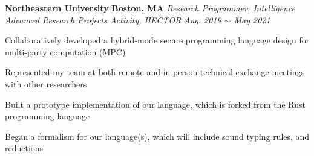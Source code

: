\item
\headerrow
{\textbf{Northeastern University}}
{\textbf{Boston, MA}}
\headerrow
{\emph{Research Programmer, Intelligence Advanced Research Projects Activity,
 HECTOR}}
{\emph{Aug. 2019 $\sim$ May 2021}}
\begin{itemize*}
    \item Collaboratively developed a hybrid-mode secure programming language
    design for multi-party computation (MPC)
    \item Represented my team at both remote and in-person technical exchange
    meetings with other researchers
    \item Built a prototype implementation of our language, which is forked
    from the Rust programming language
    \item Began a formalism for our language(s), which will include sound
    typing rules, and reductions
\end{itemize*}

